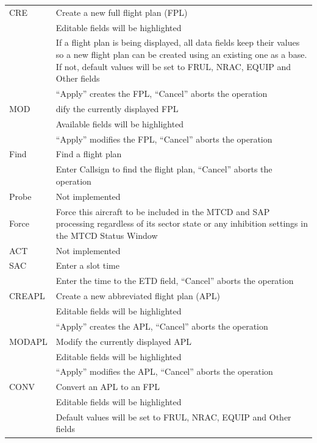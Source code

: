 \documentclass[11pt,a4paper]{memoir}
\begin{document}
\begin{tabular}{l l}
    CRE         & Create a new full flight plan (FPL)\\
                & Editable fields will be highlighted\\
                & If a flight plan is being displayed, all data fields keep their values so a new flight plan can be created using an existing one as a base. If not, default values will be set to FRUL, NRAC, EQUIP and Other fields\\
                & “Apply” creates the FPL, “Cancel” aborts the operation\\
    MOD         & dify the currently displayed FPL\\
                & Available fields will be highlighted\\
                & “Apply” modifies the FPL, “Cancel” aborts the operation\\
    Find        & Find a flight plan\\
                & Enter Callsign to find the flight plan, “Cancel” aborts the operation\\
    Probe       & Not implemented\\
    Force       & Force this aircraft to be included in the MTCD and SAP processing regardless of its sector state or any inhibition settings in the MTCD Status Window\\
    ACT         & Not implemented\\
    SAC         & Enter a slot time\\
                & Enter the time to the ETD field, “Cancel” aborts the operation\\
    CREAPL      & Create a new abbreviated flight plan (APL)\\
                & Editable fields will be highlighted\\
                & “Apply” creates the APL, “Cancel” aborts the operation\\
    MODAPL      & Modify the currently displayed APL\\
                & Editable fields will be highlighted\\
                & “Apply” modifies the APL, “Cancel” aborts the operation\\
    CONV        & Convert an APL to an FPL\\
                & Editable fields will be highlighted\\
                & Default values will be set to FRUL, NRAC, EQUIP and Other fields\\

\end{tabular}
\end{document}
